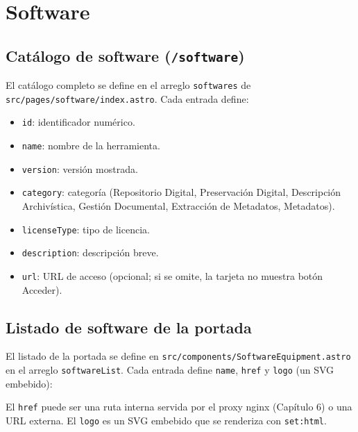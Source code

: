 \documentclass[12pt,a4paper]{report}
\begin{document}
\section{Software}

\subsection{Catálogo de software (\texttt{/software})}

El catálogo completo se define en el arreglo \texttt{softwares} de
\texttt{src/pages/software/index.astro}. Cada entrada define:

\begin{itemize}
  \item \texttt{id}: identificador numérico.
  \item \texttt{name}: nombre de la herramienta.
  \item \texttt{version}: versión mostrada.
  \item \texttt{category}: categoría (Repositorio Digital, Preservación
        Digital, Descripción Archivística, Gestión Documental, Extracción de
        Metadatos, Metadatos).
  \item \texttt{licenseType}: tipo de licencia.
  \item \texttt{description}: descripción breve.
  \item \texttt{url}: URL de acceso (opcional; si se omite, la tarjeta no
        muestra botón Acceder).
\end{itemize}

\subsection{Listado de software de la portada}

El listado de la portada se define en \texttt{src/components/SoftwareEquipment.astro}
en el arreglo \texttt{softwareList}. Cada entrada define \texttt{name},
\texttt{href} y \texttt{logo} (un SVG embebido):


El \texttt{href} puede ser una ruta interna servida por el proxy nginx
(Capítulo 6) o una URL externa. El \texttt{logo} es un SVG embebido que se
renderiza con \texttt{set:html}.
\end{document}
